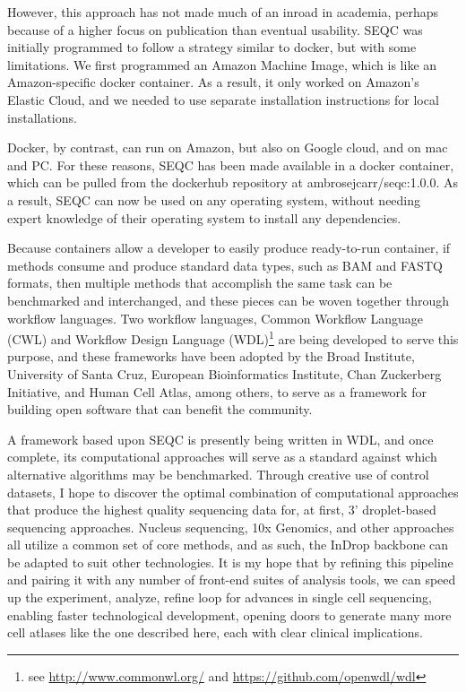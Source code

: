 However, this approach has not made much of an inroad in academia, perhaps because of a higher focus on publication than eventual usability. 
SEQC was initially programmed to follow a strategy similar to docker, but with some limitations.
We first programmed an Amazon Machine Image, which is like an Amazon-specific docker container. 
As a result, it only worked on Amazon's Elastic Cloud, and we needed to use separate installation instructions for local installations. 

Docker, by contrast, can run on Amazon, but also on Google cloud, and on mac and PC\@.
For these reasons, SEQC has been made available in a docker container, which can be pulled from the dockerhub repository at ambrosejcarr/seqc:1.0.0.
As a result, SEQC can now be used on any operating system, without needing expert knowledge of their operating system to install any dependencies. 

Because containers allow a developer to easily produce ready-to-run container, if methods consume and produce standard data types, such as BAM and FASTQ formats, then multiple methods that accomplish the same task can be benchmarked and interchanged, and these pieces can be woven together through workflow languages. 
Two workflow languages, Common Workflow Language (CWL) and Workflow Design Language (WDL)\footnote{see \url{http://www.commonwl.org/} and \url{https://github.com/openwdl/wdl}} are being developed to serve this purpose, and these frameworks have been adopted by the Broad Institute, University of Santa Cruz, European Bioinformatics Institute, Chan Zuckerberg Initiative, and Human Cell Atlas, among others, to serve as a framework for building open software that can benefit the community. 

A framework based upon SEQC is presently being written in WDL, and once complete, its computational approaches will serve as a standard against which alternative algorithms may be benchmarked.
Through creative use of control datasets, I hope to discover the optimal combination of computational approaches that produce the highest quality sequencing data for, at first, 3' droplet-based sequencing approaches. 
Nucleus sequencing, 10x Genomics, and other approaches all utilize a common set of core methods, and as such, the InDrop backbone can be adapted to suit other technologies. 
It is my hope that by refining this pipeline and pairing it with any number of front-end suites of analysis tools, we can speed up the experiment, analyze, refine loop for advances in single cell sequencing, enabling faster technological development, opening doors to generate many more cell atlases like the one described here, each with clear clinical implications. 
